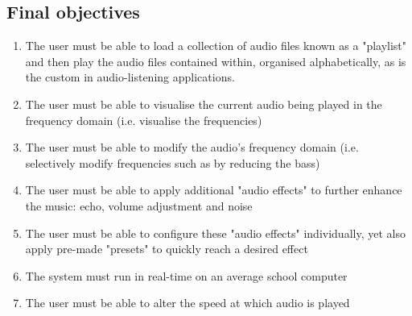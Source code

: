 \pagebreak
\subsection{Final objectives}
\begin{enumerate}
	\item  The user must be able to load a collection of audio files known as a "playlist" and then play the audio files contained within, organised alphabetically, as is the custom in audio-listening applications.
	\item  The user must be able to visualise the current audio being played in the frequency domain (i.e. visualise the frequencies)
	\item The user must be able to modify the audio's frequency domain (i.e. selectively modify frequencies such as by reducing the bass)
	\item The user must be able to apply additional "audio effects" to further enhance the music: echo, volume adjustment and noise
	\item The user must be able to configure these "audio effects" individually, yet also apply pre-made "presets" to quickly reach a desired effect
	\item  The system must run in real-time on an average school computer
	\item The user must be able to alter the speed at which audio is played
\end{enumerate}